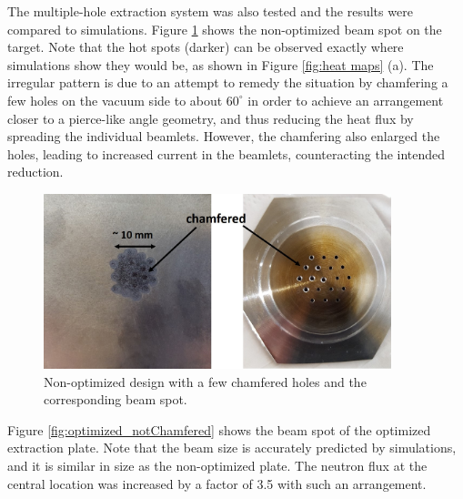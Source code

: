 \documentclass[review]{elsarticle}
\begin{document}
The multiple-hole extraction system was also tested and the results were compared to simulations. Figure \ref{fig:chamfered} shows the non-optimized beam spot on the target. Note that the hot spots (darker) can be observed exactly where simulations show they would be, as shown in Figure \ref{fig:heat maps} (a). The irregular pattern is due to an attempt to remedy the situation by chamfering a few holes on the vacuum side to about $60^{\circ}$ in order to achieve an arrangement closer to a pierce-like angle geometry, and thus reducing the heat flux by spreading the individual beamlets. However, the chamfering also enlarged the holes, leading to increased current in the beamlets, counteracting the intended reduction.

\begin{figure}
	\centering
	\includegraphics[width=0.9\textwidth]{pics/chamfered}
	\caption{Non-optimized design with a few chamfered holes and the corresponding beam spot.}
	\label{fig:chamfered}
\end{figure}  

Figure \ref{fig:optimized_notChamfered} shows the beam spot of the optimized extraction plate. Note that the beam size is accurately predicted by simulations, and it is similar in size as the non-optimized plate. The neutron flux at the central location was increased by a factor of 3.5 with such an arrangement. 
\end{document}
